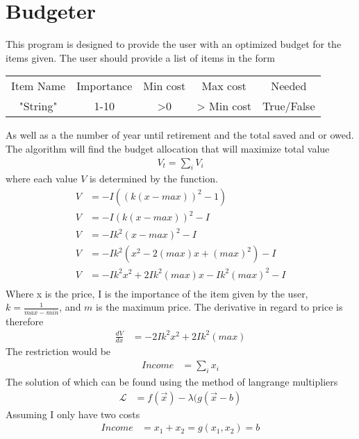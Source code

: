 \documentclass[11pt]{article}
\author{dustin}
\date{\today}
\title{}
\begin{document}
\section*{Budgeter}
This program is designed to provide the user with an optimized budget for the
items given. The user should provide a list of items in the form
\begin{center}
\begin{tabular}{ccccc}
Item Name & Importance & Min cost & Max cost & Needed\\
"String" & 1-10 & >0 & > Min cost & True/False\\
\end{tabular}
\end{center}
As well as a the number of year until retirement and the total saved and or
owed.
The algorithm will find the budget allocation that will maximize total value
\begin{align*}
  V_t = \sum_i V_i
\end{align*}
where each value \(V\) is determined by the function.
\begin{align*}
  V &= -I((k(x-max))^2-1) \\
  V &= -I(k(x-max))^2-I \\
  V &= -Ik^2(x-max)^2-I \\
  V &= -Ik^2(x^2-2(max)x+(max)^2)-I \\
  V &= -Ik^2x^2+2Ik^2(max)x-Ik^2(max)^2-I \\
\end{align*}
Where x is the price, I is the importance of the item given by the user,
\(k=\frac{1}{max-min}\), and \(m\) is the maximum price. The derivative in
regard to price is therefore
\begin{align*}
  \frac{dV}{dx} &= -2Ik^2x^2 + 2Ik^2(max)
\end{align*}
The restriction would be
\begin{align*}
  Income &= \sum_i x_i
\end{align*}
The solution of which can be found using the method of langrange multipliers
\begin{align*}
  \mathcal{L} &= f(\vec{x}) - \lambda(g(\vec{x} - b)
\end{align*}
Assuming I only have two costs
\begin{align*}
  Income &= x_1 + x_2 = g(x_1,x_2) = b
\end{align*}
\end{document}
